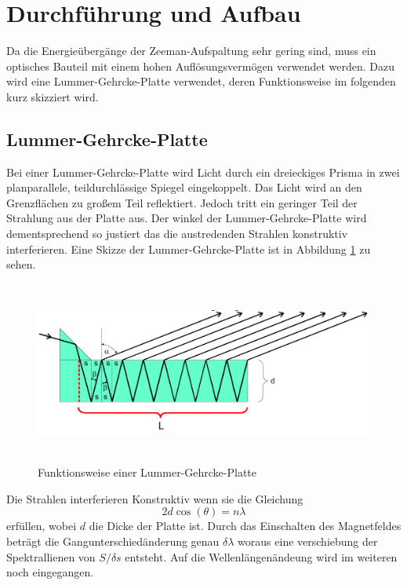 \section{Durchführung und Aufbau}
\label{sec:Durchführung}
Da die Energieübergänge der Zeeman-Aufspaltung sehr gering sind, muss ein optisches Bauteil mit einem hohen Auflösungsvermögen verwendet werden. Dazu wird eine Lummer-Gehrcke-Platte verwendet, deren Funktionsweise im folgenden kurz skizziert wird. 
\subsection{Lummer-Gehrcke-Platte}
Bei einer Lummer-Gehrcke-Platte wird Licht durch ein dreieckiges Prisma in zwei planparallele, teildurchlässige Spiegel eingekoppelt. Das Licht wird an den Grenzflächen zu großem Teil reflektiert. Jedoch tritt ein geringer Teil der Strahlung aus der Platte aus. Der winkel der Lummer-Gehrcke-Platte wird dementsprechend so justiert das die austredenden Strahlen konstruktiv interferieren. Eine Skizze der Lummer-Gehrcke-Platte ist in Abbildung \ref{fig:Lum} zu sehen.

\begin{figure}[H]
  \centering
  \includegraphics[height=6cm]{Bilder/Lummer.png}
  \caption{Funktionsweise einer Lummer-Gehrcke-Platte \cite{V27}}
  \label{fig:Lum}
\end{figure}

Die Strahlen interferieren Konstruktiv wenn sie die Gleichung 
\begin{equation}
  2 d \cos(\theta) = n \lambda
  \label{}
\end{equation}
erfüllen, wobei $d$ die Dicke der Platte ist. Durch das Einschalten des Magnetfeldes beträgt die Gangunterschiedänderung genau $\delta \lambda$ woraus eine verschiebung der Spektrallienen von $S/\delta s$ entsteht. Auf die Wellenlängenändeung wird im weiteren noch eingegangen.

